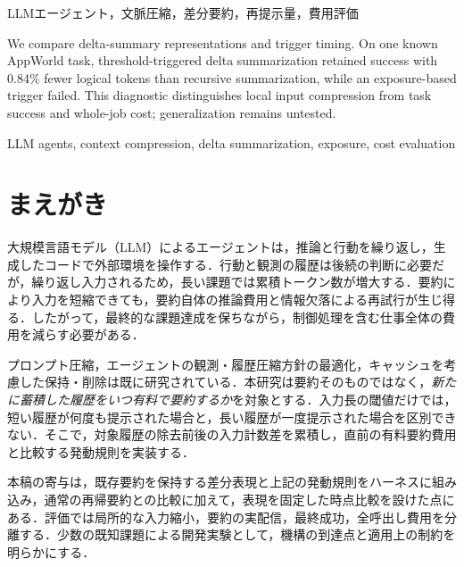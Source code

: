 \documentclass[letter]{ieicej}
\begin{document}
\maketitle
\begin{abstract}
LLMエージェントの差分要約と再提示量による発動を比較する．既知1課題で閾値型差分要約は成功を保ち費用を0.84％減らしたが，再提示量型は失敗した．局所入力縮小と全体成果の分離評価が必要である．
\end{abstract}
\begin{keyword}
LLMエージェント，文脈圧縮，差分要約，再提示量，費用評価
\end{keyword}
\begin{eabstract}
We compare delta-summary representations and trigger timing. On one known AppWorld task, threshold-triggered delta summarization retained success with 0.84\% fewer logical tokens than recursive summarization, while an exposure-based trigger failed. This diagnostic distinguishes local input compression from task success and whole-job cost; generalization remains untested.
\end{eabstract}
\begin{ekeyword}
LLM agents, context compression, delta summarization, exposure, cost evaluation
\end{ekeyword}

\section{まえがき}
大規模言語モデル（LLM）によるエージェントは，推論と行動を繰り返し\cite{yao2023react}，生成したコードで外部環境を操作する\cite{wang2024codeact}．行動と観測の履歴は後続の判断に必要だが，繰り返し入力されるため，長い課題では累積トークン数が増大する．要約により入力を短縮できても，要約自体の推論費用と情報欠落による再試行が生じ得る．したがって，最終的な課題達成を保ちながら，制御処理を含む仕事全体の費用を減らす必要がある．

プロンプト圧縮\cite{jiang2024longllmlingua}，エージェントの観測・履歴圧縮方針の最適化\cite{kang2026acon}，キャッシュを考慮した保持・削除\cite{xu2026tokenpilot}は既に研究されている．本研究は要約そのものではなく，\emph{新たに蓄積した履歴をいつ有料で要約するか}を対象とする．入力長の閾値だけでは，短い履歴が何度も提示された場合と，長い履歴が一度提示された場合を区別できない．そこで，対象履歴の除去前後の入力計数差を累積し，直前の有料要約費用と比較する発動規則を実装する．

本稿の寄与は，既存要約を保持する差分表現と上記の発動規則をハーネスに組み込み，通常の再帰要約との比較に加えて，表現を固定した時点比較を設けた点にある．評価では局所的な入力縮小，要約の実配信，最終成功，全呼出し費用を分離する．少数の既知課題による開発実験として，機構の到達点と適用上の制約を明らかにする．
\end{document}
